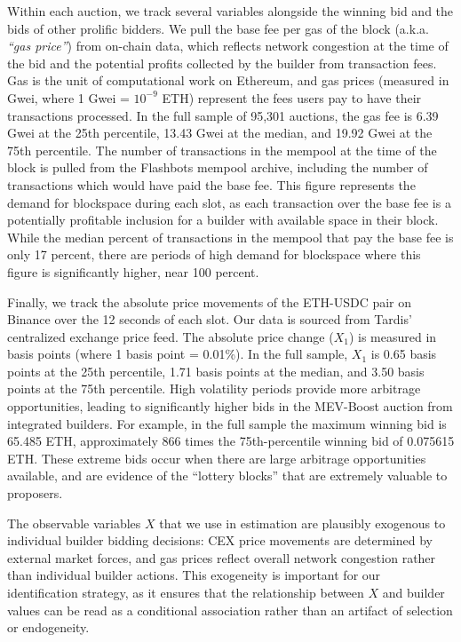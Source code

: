 \documentclass[12pt,reqno]{amsart}
\begin{document}
Within each auction, we track several variables alongside the winning bid and the bids of other prolific bidders. We pull the base fee per gas of the block (a.k.a. \textit{``gas price''}) from on-chain data, which reflects network congestion at the time of the bid and the potential profits collected by the builder from transaction fees. Gas is the unit of computational work on Ethereum, and gas prices (measured in Gwei, where 1 Gwei = $10^{-9}$ ETH) represent the fees users pay to have their transactions processed. In the full sample of 95,301 auctions, the gas fee is 6.39 Gwei at the 25th percentile, 13.43 Gwei at the median, and 19.92 Gwei at the 75th percentile. The number of transactions in the mempool at the time of the block is pulled from the Flashbots mempool archive, including the number of transactions which would have paid the base fee. 
This figure represents the demand for blockspace during each slot, as each transaction over the base fee is a potentially profitable inclusion for a builder with available space in their block. While the median percent of transactions in the mempool that pay the base fee is only 17 percent, there are periods of high demand for blockspace where this figure is significantly higher, near 100 percent. 

Finally, we track the absolute price movements of the ETH-USDC pair on Binance over the 12 seconds of each slot. Our data is sourced from Tardis' centralized exchange price feed. The absolute price change ($X_1$) is measured in basis points (where 1 basis point = 0.01\%). In the full sample, $X_1$ is 0.65 basis points at the 25th percentile, 1.71 basis points at the median, and 3.50 basis points at the 75th percentile. High volatility periods provide more arbitrage opportunities, leading to significantly higher bids in the MEV-Boost auction from integrated builders. For example, in the full sample the maximum winning bid is 65.485 ETH, approximately 866 times the 75th-percentile winning bid of 0.075615 ETH. These extreme bids occur when there are large arbitrage opportunities available, and are evidence of the ``lottery blocks'' that are extremely valuable to proposers. 

The observable variables $X$ that we use in estimation are plausibly exogenous to individual builder bidding decisions: CEX price movements are determined by external market forces, and gas prices reflect overall network congestion rather than individual builder actions. This exogeneity is important for our identification strategy, as it ensures that the relationship between $X$ and builder values can be read as a conditional association rather than an artifact of selection or endogeneity.
\end{document}
